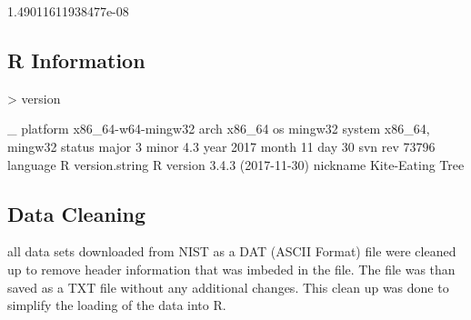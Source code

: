 \documentclass[10pt]{article}
\begin{document}
\begin{Schunk}
\begin{Soutput}
[1] 1.49011611938477e-08
\end{Soutput}
\end{Schunk}
\subsection{R Information}
\begin{Schunk}
\begin{Sinput}
> version
\end{Sinput}
\begin{Soutput}
               _                           
platform       x86_64-w64-mingw32          
arch           x86_64                      
os             mingw32                     
system         x86_64, mingw32             
status                                     
major          3                           
minor          4.3                         
year           2017                        
month          11                          
day            30                          
svn rev        73796                       
language       R                           
version.string R version 3.4.3 (2017-11-30)
nickname       Kite-Eating Tree            
\end{Soutput}
\end{Schunk}

\subsection{Data Cleaning}
all data sets downloaded from NIST as a DAT (ASCII Format) file were cleaned up 
to remove header information that was imbeded in the file. The file was than saved
as a TXT file without any additional changes. This clean up was done to simplify 
the loading of the data into R.
\end{document}
